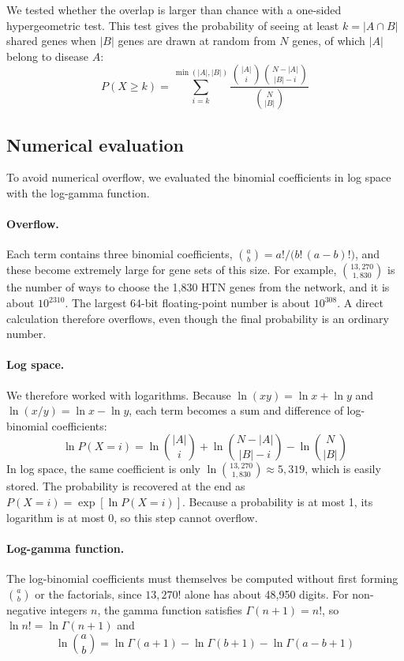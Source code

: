 \documentclass[11pt]{article}
\begin{document}
We tested whether the overlap is larger than chance with a one-sided hypergeometric test. This test gives the probability of seeing at least $k = |A \cap B|$ shared genes when $|B|$ genes are drawn at random from $N$ genes, of which $|A|$ belong to disease $A$:
\begin{equation}
  P(X \ge k) = \sum_{i=k}^{\min(|A|,|B|)} \frac{\binom{|A|}{i}\binom{N-|A|}{|B|-i}}{\binom{N}{|B|}}
\end{equation}


\subsection{Numerical evaluation}

To avoid numerical overflow, we evaluated the binomial coefficients in log space with the log-gamma function.

\paragraph{Overflow.} Each term contains three binomial coefficients, $\binom{a}{b} = a!/\bigl(b!\,(a-b)!\bigr)$, and these become extremely large for gene sets of this size. For example, $\binom{13{,}270}{1{,}830}$ is the number of ways to choose the 1,830 HTN genes from the network, and it is about $10^{2310}$. The largest 64-bit floating-point number is about $10^{308}$. A direct calculation therefore overflows, even though the final probability is an ordinary number.

\paragraph{Log space.} We therefore worked with logarithms. Because $\ln(xy) = \ln x + \ln y$ and $\ln(x/y) = \ln x - \ln y$, each term becomes a sum and difference of log-binomial coefficients:
\begin{equation}
  \ln P(X = i) = \ln\binom{|A|}{i} + \ln\binom{N-|A|}{|B|-i} - \ln\binom{N}{|B|}
\end{equation}
In log space, the same coefficient is only $\ln\binom{13{,}270}{1{,}830} \approx 5{,}319$, which is easily stored. The probability is recovered at the end as $P(X = i) = \exp[\ln P(X = i)]$. Because a probability is at most 1, its logarithm is at most 0, so this step cannot overflow.

\paragraph{Log-gamma function.} The log-binomial coefficients must themselves be computed without first forming $\binom{a}{b}$ or the factorials, since $13{,}270!$ alone has about 48,950 digits. For non-negative integers $n$, the gamma function satisfies $\Gamma(n+1) = n!$, so $\ln n! = \ln\Gamma(n+1)$ and
\begin{equation}
  \ln \binom{a}{b} = \ln\Gamma(a+1) - \ln\Gamma(b+1) - \ln\Gamma(a-b+1)
\end{equation}
\end{document}
